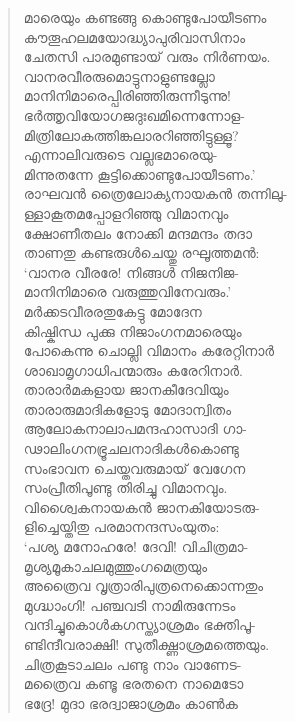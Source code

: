 \begin{verse}
മാരെയും കണ്ടങ്ങു കൊണ്ടുപോയീടണം\\
കൗതൂഹലമയോദ്ധ്യാപുരിവാസിനാം\\
ചേതസി പാരമുണ്ടായ് വരും നിര്‍ണയം.\\
വാനരവീരരുമൊട്ടുനാളുണ്ടല്ലോ\\
മാനിനിമാരെപ്പിരിഞ്ഞിരുന്നീടുന്നു!\\
ഭര്‍ത്തൃവിയോഗജദുഃഖമിന്നെന്നോള-\\
മിത്രിലോകത്തിങ്കലാരറിഞ്ഞിട്ടുള്ളൂ?\\
എന്നാലിവരുടെ വല്ലഭമാരെയു-\\
മിന്നുതന്നേ കൂട്ടിക്കൊണ്ടുപോയീടണം.’\\
രാഘവന്‍ ത്രൈലോക്യനായകന്‍ തന്നിലു-\\
ള്ളാകൂതമപ്പോളറിഞ്ഞു വിമാനവും\\
ക്ഷോണീതലം നോക്കി മന്ദമന്ദം തദാ\\
താണതു കണ്ടരുള്‍ചെയ്തു രഘൂത്തമന്‍:\\
‘വാനര വീരരേ! നിങ്ങള്‍ നിജനിജ-\\
മാനിനിമാരെ വരുത്തുവിനേവരും.’\\
മര്‍ക്കടവീരരതുകേട്ടു മോദേന\\
കിഷ്കിന്ധ പുക്കു നിജാംഗനമാരെയും\\
പോകെന്നു ചൊല്ലി വിമാനം കരേറ്റിനാര്‍\\
ശാഖാമൃഗാധിപന്മാരും കരേറിനാര്‍.\\
താരാര്‍മകളായ ജാനകീദേവിയും\\
താരാരുമാദികളോടു മോദാന്വിതം\\
ആലോകനാലാപമന്ദഹാസാദി ഗാ-\\
ഢാലിംഗനഭ്രൂചലനാദികള്‍കൊണ്ടു\\
സംഭാവന ചെയ്തവരുമായ് വേഗേന\\
സംപ്രീതിപൂണ്ടു തിരിച്ചു വിമാനവും.\\
വിശ്വൈകനായകന്‍ ജാനകിയോടരു-\\
ളിച്ചെയ്തിതു പരമാനന്ദസംയുതം:\\
‘പശ്യ മനോഹരേ! ദേവി! വിചിത്രമാ-\\
മൃശ്യമൂകാചലമുത്തുംഗമെത്രയും\\
അത്രൈവ വൃത്രാരിപുത്രനെക്കൊന്നതും\\
മുഗ്ദ്ധാംഗി! പഞ്ചവടി നാമിരുന്നേടം\\
വന്ദിച്ചുകൊള്‍കഗസ്ത്യാശ്രമം ഭക്തിപൂ-\\
ണ്ടിന്ദീവരാക്ഷി! സുതീക്ഷ്ണാശ്രമത്തെയും.\\
ചിത്രകൂടാചലം പണ്ടു നാം വാണേട-\\
മത്രൈവ കണ്ടൂ ഭരതനെ നാമെടോ\\
ഭദ്രേ! മുദാ ഭരദ്വാജാശ്രമം കാണ്‍ക\\

\end{verse}
